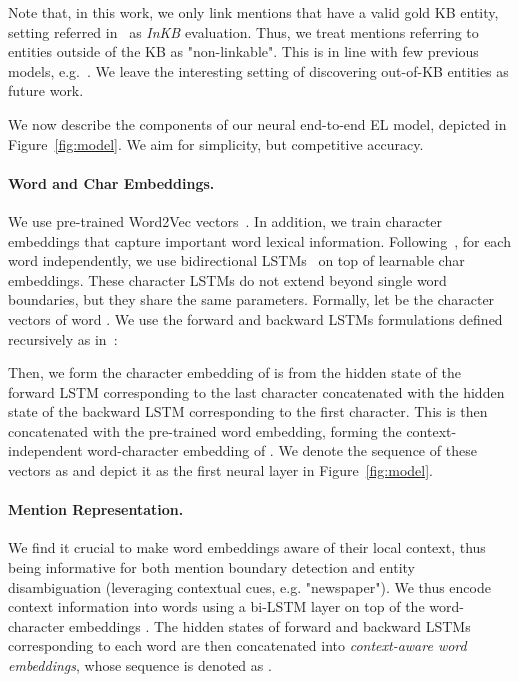 \documentclass[11pt,a4paper]{article}
\begin{document}
Note that, in this work, we only link mentions that have a valid gold KB entity, setting referred in~\citep{roder2017gerbil} as \textit{InKB} evaluation. Thus, we treat mentions referring to entities outside of the KB as "non-linkable". This is in line with few previous models, e.g.~\citep{luo2015joint,ganea2017deep,yamada2016joint}. We leave the interesting setting of discovering out-of-KB entities as future work.

We now describe the components of our neural end-to-end EL model, depicted in Figure~\ref{fig:model}. We aim for simplicity, but competitive accuracy. 

\paragraph{Word and Char Embeddings.}
We use pre-trained Word2Vec vectors~\citep{mikolov2013distributed}. In addition, we train character embeddings that capture important word lexical information. Following~\citep{lample2016neural}, for each word independently, we use bidirectional LSTMs~\citep{hochreiter1997long} on top of learnable char embeddings. These character LSTMs do not extend beyond single word boundaries, but they share the same parameters. Formally, let  be the character vectors of word . We use the forward and backward LSTMs formulations defined recursively as in~\citep{lample2016neural}:
 
Then, we form the character embedding of  is  from the hidden state of the forward LSTM corresponding to the last character concatenated with the hidden state of the backward LSTM corresponding to the first character. This is then concatenated with the pre-trained word embedding, forming the context-independent word-character embedding of . We denote the sequence of these vectors as  and depict it as the first neural layer in Figure~\ref{fig:model}. 


\paragraph{Mention Representation.}
We find it crucial to make word embeddings aware of their local context, thus being informative for both mention boundary detection and entity disambiguation (leveraging contextual cues, e.g. "newspaper"). We thus encode context information into words using a bi-LSTM layer on top of the word-character embeddings . The hidden states of forward and backward LSTMs corresponding to each word are then concatenated into \textit{context-aware word embeddings}, whose sequence is denoted as . 
\end{document}
